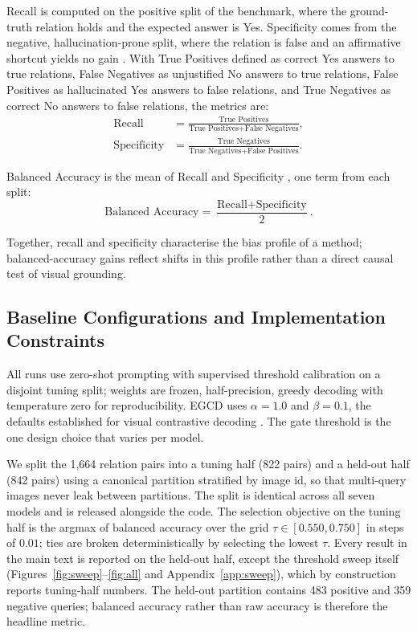 \documentclass[pdflatex,sn-basic,Numbered]{sn-jnl}
\theoremstyle{thmstyleone}
\theoremstyle{thmstyletwo}
\theoremstyle{thmstylethree}
\begin{document}
Recall is computed on the positive split of the benchmark, where the ground-truth relation holds and the expected answer is Yes. Specificity comes from the negative, hallucination-prone split, where the relation is false and an affirmative shortcut yields no gain \cite{yin2025mirage}. With True Positives defined as correct Yes answers to true relations, False Negatives as unjustified No answers to true relations, False Positives as hallucinated Yes answers to false relations, and True Negatives as correct No answers to false relations, the metrics are:
\begin{align}
\text{Recall} &= \frac{\text{True Positives}}{\text{True Positives} + \text{False Negatives}}, \label{eq:recall}\\
\text{Specificity} &= \frac{\text{True Negatives}}{\text{True Negatives} + \text{False Positives}}. \label{eq:spec}
\end{align}

Balanced Accuracy is the mean of Recall and Specificity \cite{brodersen2010balanced}, one term from each split:
\begin{equation}\label{eq:balacc}
\text{Balanced Accuracy} = \frac{\text{Recall} + \text{Specificity}}{2}.
\end{equation}

Together, recall and specificity characterise the bias profile of a method; balanced-accuracy gains reflect shifts in this profile rather than a direct causal test of visual grounding.

\subsection{Baseline Configurations and Implementation Constraints}\label{subsec:baselines}

All runs use zero-shot prompting with supervised threshold calibration on a disjoint tuning split; weights are frozen, half-precision, greedy decoding with temperature zero for reproducibility. EGCD uses $\alpha = 1.0$ and $\beta = 0.1$, the defaults established for visual contrastive decoding \cite{leng2024mitigating}. The gate threshold is the one design choice that varies per model.

We split the 1,664 relation pairs into a tuning half (822 pairs) and a held-out half (842 pairs) using a canonical partition stratified by image id, so that multi-query images never leak between partitions. The split is identical across all seven models and is released alongside the code. The selection objective on the tuning half is the argmax of balanced accuracy over the grid $\tau \in [0.550, 0.750]$ in steps of $0.01$; ties are broken deterministically by selecting the lowest $\tau$. Every result in the main text is reported on the held-out half, except the threshold sweep itself (Figures~\ref{fig:sweep}--\ref{fig:all} and Appendix~\ref{app:sweep}), which by construction reports tuning-half numbers. The held-out partition contains 483 positive and 359 negative queries; balanced accuracy rather than raw accuracy is therefore the headline metric.
\end{document}
